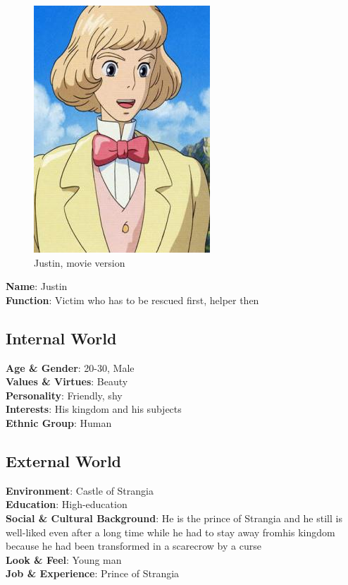\begin{figure}[H]
  \includegraphics{Images/Characters/justin}
  \caption{Justin, movie version }
\end{figure}

\textbf{Name}: Justin \\
\textbf{Function}: Victim who has to be rescued first, helper then

\subsection{Internal World}

\textbf{Age \& Gender}: 20-30, Male \\
\textbf{Values \& Virtues}: Beauty \\
\textbf{Personality}: Friendly, shy \\
\textbf{Interests}: His kingdom and his subjects \\
\textbf{Ethnic Group}: Human

\subsection{External World}
\textbf{Environment}: Castle of Strangia\\
\textbf{Education}: High-education \\
\textbf{Social \& Cultural Background}: He is the prince of Strangia and he still is well-liked even after a long time while he had to stay away fromhis kingdom because he had been transformed in a scarecrow by a curse \\
\textbf{Look \& Feel}: Young man   \\
\textbf{Job \& Experience}: Prince of Strangia \\


